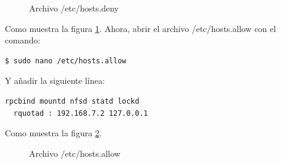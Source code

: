 \begin{figure}[H] %
\caption{Archivo /etc/hosts.deny}
\label{fig:NFSKer4}
\end{figure}

Como muestra la figura \ref{fig:NFSKer4}. Ahora, abrir el archivo /etc/hosts.allow con el comando:

\begin{lstlisting}[language=bash]
$ sudo nano /etc/hosts.allow
\end{lstlisting}

Y añadir la siguiente línea:

\begin{lstlisting}[language=bash]
  rpcbind mountd nfsd statd lockd 
  rquotad : 192.168.7.2 127.0.0.1 
\end{lstlisting}

Como muestra la figura \ref{fig:NFSKer5}.

\begin{figure}[H] %
\caption{Archivo /etc/hosts.allow}
\label{fig:NFSKer5}
\end{figure}

